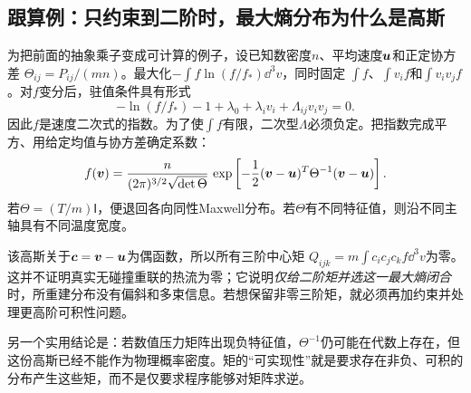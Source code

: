 \subsection{跟算例：只约束到二阶时，最大熵分布为什么是高斯}
为把前面的抽象乘子变成可计算的例子，设已知数密度$n$、平均速度$\bm{u}$和正定协方差
$\Theta_{ij}=P_{ij}/(mn)$。最大化$-\int f\ln(f/f_*)\dd^3v$，同时固定
$\int f$、$\int v_if$和$\int v_iv_jf$。对$f$变分后，驻值条件具有形式
\begin{equation}
 -\ln(f/f_*)-1+\lambda_0+\lambda_iv_i+\Lambda_{ij}v_iv_j=0.
\end{equation}
因此$f$是速度二次式的指数。为了使$\int f$有限，二次型$\Lambda$必须负定。把指数完成平方、用给定均值与协方差确定系数：
\begin{equation}
 f(\bm{v})={n\over(2\pi)^{3/2}\sqrt{\det\Theta}}\,
 \exp\left[-{1\over2}(\bm{v}-\bm{u})^T\Theta^{-1}(\bm{v}-\bm{u})\right].
\end{equation}
若$\Theta=(T/m)\mathsf I$，便退回各向同性Maxwell分布。若$\Theta$有不同特征值，则沿不同主轴具有不同温度宽度。

该高斯关于$\bm{c}=\bm{v}-\bm{u}$为偶函数，所以所有三阶中心矩
$Q_{ijk}=m\int c_ic_jc_kf\dd^3v$为零。这并不证明真实无碰撞重联的热流为零；它说明\emph{仅给二阶矩并选这一最大熵闭合}时，所重建分布没有偏斜和多束信息。若想保留非零三阶矩，就必须再加约束并处理更高阶可积性问题。

另一个实用结论是：若数值压力矩阵出现负特征值，$\Theta^{-1}$仍可能在代数上存在，但这份高斯已经不能作为物理概率密度。矩的“可实现性”就是要求存在非负、可积的分布产生这些矩，而不是仅要求程序能够对矩阵求逆。

